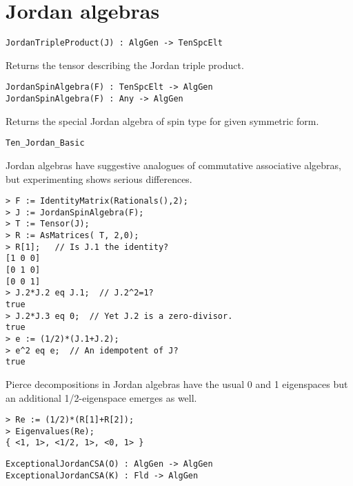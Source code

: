 \section{Jordan algebras}


\color{blue}
{\small \begin{verbatim}
JordanTripleProduct(J) : AlgGen -> TenSpcElt
\end{verbatim}}
\color{black}

Returns the tensor describing the Jordan triple product.

\color{blue}
{\small \begin{verbatim}
JordanSpinAlgebra(F) : TenSpcElt -> AlgGen
JordanSpinAlgebra(F) : Any -> AlgGen
\end{verbatim}}
\color{black}

Returns the special Jordan algebra of spin type for given symmetric form.

\begin{framed}
 {\tt Ten\_Jordan\_Basic}\\
{\small
Jordan algebras have suggestive analogues of 
commutative associative algebras, but experimenting shows serious 
differences.
\begin{lstlisting}[frame=single,basicstyle=\ttfamily\color{black!30!
teal},backgroundcolor=\color{white!70!gray}]
> F := IdentityMatrix(Rationals(),2);
> J := JordanSpinAlgebra(F);
> T := Tensor(J); 
> R := AsMatrices( T, 2,0); 
> R[1];   // Is J.1 the identity?
[1 0 0]
[0 1 0]
[0 0 1]
> J.2*J.2 eq J.1;  // J.2^2=1?
true
> J.2*J.3 eq 0;  // Yet J.2 is a zero-divisor.
true
> e := (1/2)*(J.1+J.2);             
> e^2 eq e;  // An idempotent of J?
true
\end{lstlisting}
Pierce decompositions in Jordan algebras have the usual 0 and 1 eigenspaces
but an additional 1/2-eigenspace emerges as well.
\begin{lstlisting}[frame=single,basicstyle=\ttfamily\color{black!30!
teal},backgroundcolor=\color{white!70!gray}]
> Re := (1/2)*(R[1]+R[2]);
> Eigenvalues(Re);
{ <1, 1>, <1/2, 1>, <0, 1> }
\end{lstlisting}
}
\end{framed}


\color{blue}
{\small \begin{verbatim}
ExceptionalJordanCSA(O) : AlgGen -> AlgGen
ExceptionalJordanCSA(K) : Fld -> AlgGen
\end{verbatim}}
\color{black}

